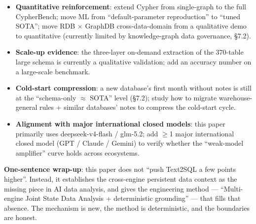 \documentclass[11pt]{article}
\begin{document}
\begin{itemize}
\item
  \textbf{Quantitative reinforcement}: extend Cypher from single-graph to the full CypherBench; move ML from ``default-parameter reproduction'' to ``tuned SOTA''; move RDB $\times$ GraphDB cross-data-domain from a qualitative demo to quantitative (currently limited by knowledge-graph data governance, \S{}7.2).
\item
  \textbf{Scale-up evidence}: the three-layer on-demand extraction of the 370-table large schema is currently a qualitative validation; add an accuracy number on a large-scale benchmark.
\item
  \textbf{Cold-start compression}: a new database's first month without notes is still at the ``schema-only $\approx$ SOTA'' level (\S{}7.2); study how to migrate warehouse-general rules + similar databases' notes to compress the cold-start cycle.
\item
  \textbf{Alignment with major international closed models}: this paper primarily uses deepseek-v4-flash / glm-5.2; add $\geq$1 major international closed model (GPT / Claude / Gemini) to verify whether the ``weak-model amplifier'' curve holds across ecosystems.
\end{itemize}

\textbf{One-sentence wrap-up}: this paper does not ``push Text2SQL a few points higher''. Instead, it establishes the cross-engine persistent data context as the missing piece in AI data analysis, and gives the engineering method --- ``Multi-engine Joint State Data Analysis + deterministic grounding'' --- that fills that absence. The mechanism is new, the method is deterministic, and the boundaries are honest.



\end{document}
